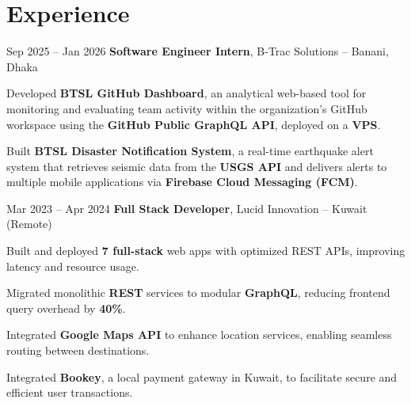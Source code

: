 \section{Experience}

\begin{twocolentry}{Sep 2025 – Jan 2026}
    \textbf{Software Engineer Intern}, B-Trac Solutions -- Banani, Dhaka
\end{twocolentry}


\begin{onecolentry}
    \begin{highlights}

        \item Developed \textbf{BTSL GitHub Dashboard}, an analytical web-based tool for monitoring and evaluating team activity within the organization’s GitHub workspace using the \textbf{GitHub Public GraphQL API}, deployed on a \textbf{VPS}.

        \item Built \textbf{BTSL Disaster Notification System}, a real-time earthquake alert system that retrieves seismic data from the \textbf{USGS API} and delivers alerts to multiple mobile applications via \textbf{Firebase Cloud Messaging (FCM)}.

    \end{highlights}
\end{onecolentry}

\vspace{0.05 cm}

\begin{twocolentry}{Mar 2023 – Apr 2024}
    \textbf{Full Stack Developer}, Lucid Innovation -- Kuwait (Remote)
\end{twocolentry}


\begin{onecolentry}
    \begin{highlights}

        \item Built and deployed \textbf{7 full-stack} web apps with optimized REST APIs, improving latency and resource usage.

        \item Migrated monolithic \textbf{REST} services to modular \textbf{GraphQL}, reducing frontend query overhead by \textbf{40\%}.

        \item Integrated \textbf{Google Maps API} to enhance location services, enabling seamless routing between destinations.

        \item Integrated \textbf{Bookey}, a local payment gateway in Kuwait, to facilitate secure and efficient user transactions.

    \end{highlights}
\end{onecolentry}